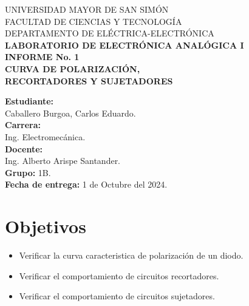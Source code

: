 \documentclass[letter,twoside,11pt]{article}
\begin{document}
\begin{titlepage}
    \begin{center}
        {\Large UNIVERSIDAD MAYOR DE SAN SIMÓN}\\
        \vspace*{0.15cm}
        {\large FACULTAD DE CIENCIAS Y TECNOLOGÍA}\\
        \vspace*{0.10cm}
        DEPARTAMENTO DE ELÉCTRICA-ELECTRÓNICA\\
        \vspace*{3.0cm}
        {\Large \textbf{LABORATORIO DE ELECTRÓNICA ANALÓGICA I}}\\
        \vspace*{0.3cm}
        {\Large \textbf{INFORME No. 1}}\\
        \vspace*{3.5cm}
        {\Large \textbf{CURVA DE POLARIZACIÓN,\\RECORTADORES Y SUJETADORES}}\\
    \end{center}

    \vspace*{5.8cm}
    \leftskip=7.95cm
    \noindent
    \textbf{Estudiante:}\\
    Caballero Burgoa, Carlos Eduardo.\\
    \newline
    \textbf{Carrera:}\\
    Ing. Electromecánica.\\
    \newline
    \textbf{Docente:}\\
    Ing. Alberto Arispe Santander.\\
    \newline
    \textbf{Grupo:} 1B.\\
    \textbf{Fecha de entrega:} 1 de Octubre del 2024.\\
\end{titlepage}

\section{Objetivos}
\begin{itemize}
    \item Verificar la curva caracteristica de polarización de un diodo.
    \item Verificar el comportamiento de circuitos recortadores.
    \item Verificar el comportamiento de circuitos sujetadores.
\end{itemize}
\end{document}
